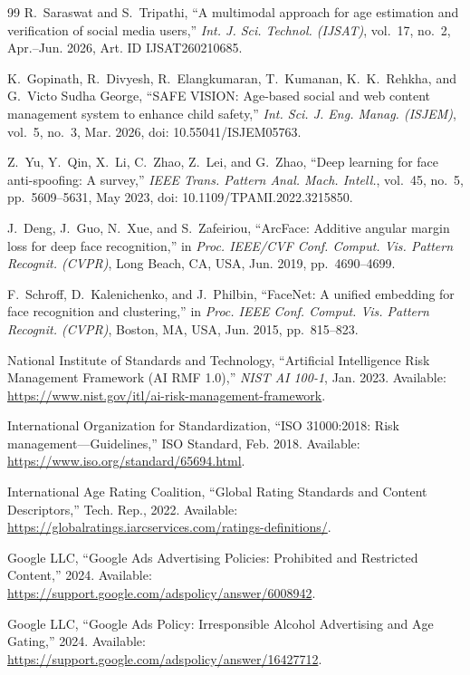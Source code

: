 \documentclass[12pt,a4paper]{report}
\begin{document}
\begin{thebibliography}{99}
R.~Saraswat and S.~Tripathi,
``A multimodal approach for age estimation and verification of social media users,''
\emph{Int. J. Sci. Technol. (IJSAT)}, vol.~17, no.~2, Apr.--Jun. 2026, Art. ID IJSAT260210685.

K.~Gopinath, R.~Divyesh, R.~Elangkumaran, T.~Kumanan, K.~K.~Rehkha, and G.~Victo Sudha George,
``SAFE VISION: Age-based social and web content management system to enhance child safety,''
\emph{Int. Sci. J. Eng. Manag. (ISJEM)}, vol.~5, no.~3, Mar. 2026, doi: 10.55041/ISJEM05763.

Z.~Yu, Y.~Qin, X.~Li, C.~Zhao, Z.~Lei, and G.~Zhao,
``Deep learning for face anti-spoofing: A survey,''
\emph{IEEE Trans. Pattern Anal. Mach. Intell.}, vol.~45, no.~5, pp.~5609--5631, May 2023, doi: 10.1109/TPAMI.2022.3215850.

J.~Deng, J.~Guo, N.~Xue, and S.~Zafeiriou,
``ArcFace: Additive angular margin loss for deep face recognition,''
in \emph{Proc. IEEE/CVF Conf. Comput. Vis. Pattern Recognit. (CVPR)}, Long Beach, CA, USA, Jun. 2019, pp.~4690--4699.

F.~Schroff, D.~Kalenichenko, and J.~Philbin,
``FaceNet: A unified embedding for face recognition and clustering,''
in \emph{Proc. IEEE Conf. Comput. Vis. Pattern Recognit. (CVPR)}, Boston, MA, USA, Jun. 2015, pp.~815--823.

National Institute of Standards and Technology,
``Artificial Intelligence Risk Management Framework (AI RMF 1.0),''
\emph{NIST AI 100-1}, Jan. 2023. Available: \url{https://www.nist.gov/itl/ai-risk-management-framework}.

International Organization for Standardization,
``ISO 31000:2018: Risk management---Guidelines,''
ISO Standard, Feb. 2018. Available: \url{https://www.iso.org/standard/65694.html}.

International Age Rating Coalition,
``Global Rating Standards and Content Descriptors,''
Tech. Rep., 2022. Available: \url{https://globalratings.iarcservices.com/ratings-definitions/}.

Google LLC,
``Google Ads Advertising Policies: Prohibited and Restricted Content,''
2024. Available: \url{https://support.google.com/adspolicy/answer/6008942}.

Google LLC,
``Google Ads Policy: Irresponsible Alcohol Advertising and Age Gating,''
2024. Available: \url{https://support.google.com/adspolicy/answer/16427712}.


\end{thebibliography}
\end{document}
